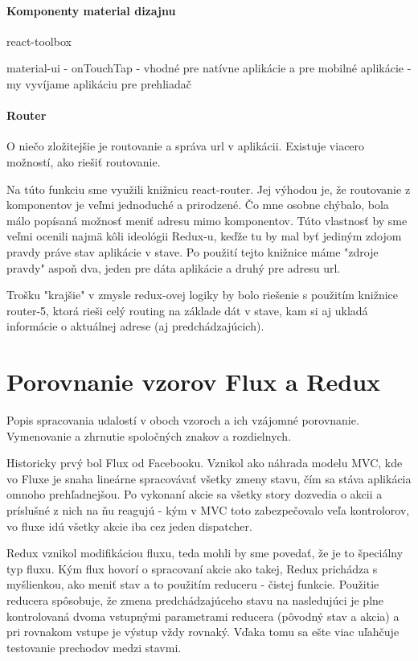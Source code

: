 \paragraph{Komponenty material dizajnu}

react-toolbox

material-ui
- onTouchTap
- vhodné pre natívne aplikácie a pre mobilné aplikácie
- my vyvíjame aplikáciu pre prehliadač

\paragraph{Router}%
O niečo zložitejšie je routovanie a správa url v aplikácii. Existuje viacero možností, ako riešiť routovanie. 

Na túto funkciu sme využili knižnicu react-router. Jej výhodou je, že routovanie z komponentov je veľmi jednoduché a prirodzené. Čo mne osobne chýbalo, bola málo popísaná možnosť meniť adresu mimo komponentov. Túto vlastnosť by sme veľmi ocenili najmä kôli ideológii Redux-u, keďže tu by mal byť jediným zdojom pravdy práve stav aplikácie v stave. Po použití tejto knižnice máme "zdroje pravdy" aspoň dva, jeden pre dáta aplikácie a druhý pre adresu url. %

Trošku "krajšie" v zmysle redux-ovej logiky by bolo riešenie s použitím knižnice router-5, ktorá rieši celý routing na základe dát v stave, kam si aj ukladá informácie o aktuálnej adrese (aj predchádzajúcich).%

\cite[gettting started]{Redux}






\section{Porovnanie vzorov Flux a Redux}
Popis spracovania udalostí v oboch vzoroch a ich vzájomné porovnanie. Vymenovanie a zhrnutie spoločných znakov a rozdielnych.

Historicky prvý bol Flux od Facebooku. Vznikol ako náhrada modelu MVC, kde vo Fluxe je snaha lineárne spracovávať všetky zmeny stavu, čím sa stáva aplikácia omnoho prehľadnejšou. Po vykonaní akcie sa všetky story dozvedia o akcii a príslušné z nich na ňu reagujú - kým v MVC toto zabezpečovalo veľa kontrolorov, vo fluxe idú všetky akcie iba cez jeden dispatcher.

Redux vznikol modifikáciou fluxu, teda mohli by sme povedať, že je to špeciálny typ fluxu. Kým flux hovorí o spracovaní akcie ako takej, Redux prichádza s myšlienkou, ako meniť stav a to použitím reduceru - čistej funkcie. Použitie reducera spôsobuje, že zmena predchádzajúceho stavu na nasledujúci je plne kontrolovaná dvoma vstupnými parametrami reducera (pôvodný stav a akcia) a pri rovnakom vstupe je výstup vždy rovnaký. Vďaka tomu sa ešte viac uľahčuje testovanie prechodov medzi stavmi.


